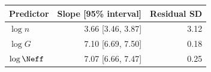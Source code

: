 \begin{tabular}{@{}lrr@{}}
\toprule
Predictor & Slope [95\% interval] & Residual SD \\
\midrule
$\log n$ & 3.66 [3.46, 3.87] & 3.12 \\
$\log G$ & 7.10 [6.69, 7.50] & 0.18 \\
$\log\Neff$ & 7.07 [6.66, 7.47] & 0.25 \\
\bottomrule
\end{tabular}
